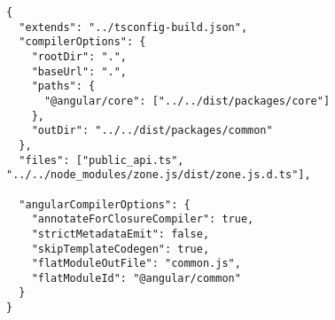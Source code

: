\begin{verbatim}
{
  "extends": "../tsconfig-build.json",
  "compilerOptions": {
    "rootDir": ".",
    "baseUrl": ".",
    "paths": {
      "@angular/core": ["../../dist/packages/core"]
    },
    "outDir": "../../dist/packages/common"
  },
  "files": ["public_api.ts", "../../node_modules/zone.js/dist/zone.js.d.ts"],

  "angularCompilerOptions": {
    "annotateForClosureCompiler": true,
    "strictMetadataEmit": false,
    "skipTemplateCodegen": true,
    "flatModuleOutFile": "common.js",
    "flatModuleId": "@angular/common"
  }
}
\end{verbatim}

